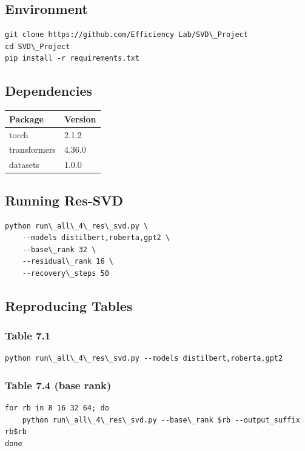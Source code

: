 \subsection{Environment}

\begin{lstlisting}
git clone https://github.com/Efficiency Lab/SVD\_Project
cd SVD\_Project
pip install -r requirements.txt
\end{lstlisting}

\subsection{Dependencies}

\begin{table}[H]
\centering
\small
\begin{tabular}{ll}
\toprule
\textbf{Package} & \textbf{Version} \\
\midrule
torch & 2.1.2 \\
transformers & 4.36.0 \\
datasets & 1.0.0 \\
\bottomrule
\end{tabular}
\end{table}

\subsection{Running Res-SVD}

\begin{lstlisting}
python run\_all\_4\_res\_svd.py \
    --models distilbert,roberta,gpt2 \
    --base\_rank 32 \
    --residual\_rank 16 \
    --recovery\_steps 50
\end{lstlisting}

\subsection{Reproducing Tables}

\subsubsection{Table 7.1}
\begin{lstlisting}
python run\_all\_4\_res\_svd.py --models distilbert,roberta,gpt2
\end{lstlisting}

\subsubsection{Table 7.4 (base rank)}
\begin{lstlisting}
for rb in 8 16 32 64; do
    python run\_all\_4\_res\_svd.py --base\_rank $rb --output_suffix rb$rb
done
\end{lstlisting}

